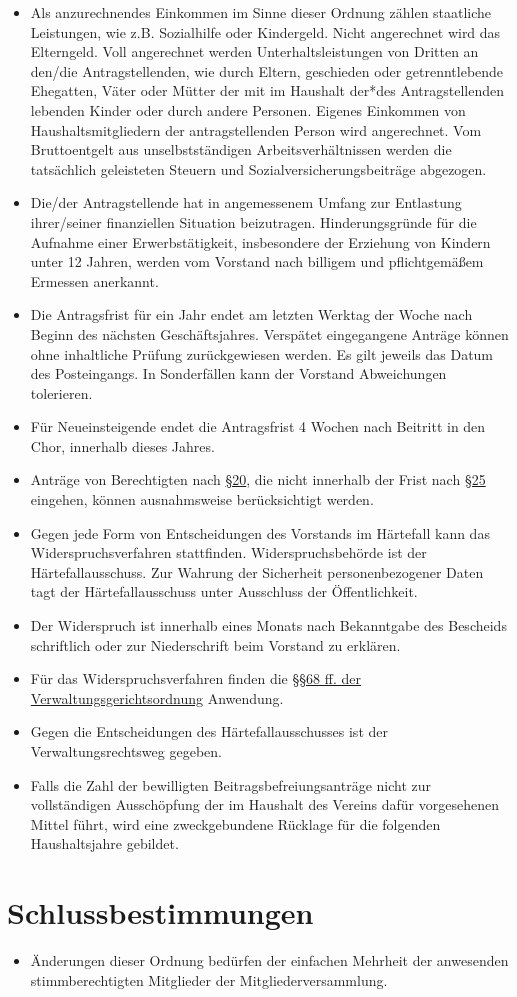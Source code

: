 \documentclass[12pt,paper=a4,ngerman]{report}
\begin{document}
\begin{itemize}
    \item Als anzurechnendes Einkommen im Sinne dieser Ordnung zählen staatliche Leistungen, wie z.B. Sozialhilfe oder Kindergeld. Nicht angerechnet wird das Elterngeld. Voll angerechnet werden Unterhaltsleistungen von Dritten an den/die Antragstellenden, wie durch Eltern, geschieden oder getrenntlebende Ehegatten, Väter oder Mütter der mit im Haushalt der*des Antragstellenden lebenden Kinder oder durch andere Personen. Eigenes Einkommen von Haushaltsmitgliedern der antragstellenden Person wird angerechnet. Vom Bruttoentgelt aus unselbstständigen Arbeitsverhältnissen werden die tatsächlich geleisteten Steuern und Sozialversicherungsbeiträge abgezogen.
    \item Die/der Antragstellende hat in angemessenem Umfang zur Entlastung ihrer/seiner finanziellen Situation beizutragen. Hinderungsgründe für die Aufnahme einer Erwerbstätigkeit, insbesondere der Erziehung von Kindern unter 12 Jahren, werden vom Vorstand nach billigem und pflichtgemäßem Ermessen anerkannt.
    \item Die Antragsfrist für ein Jahr endet am letzten Werktag der Woche nach Beginn des nächsten Geschäftsjahres. Verspätet eingegangene Anträge können ohne inhaltliche Prüfung zurückgewiesen werden. Es gilt jeweils das Datum des Posteingangs. In Sonderfällen kann der Vorstand Abweichungen tolerieren.
    \item Für Neueinsteigende endet die Antragsfrist 4 Wochen nach Beitritt in den Chor, innerhalb dieses Jahres.
    \item Anträge von Berechtigten nach \hyperref[par-20]{§20}, die nicht innerhalb der Frist nach \hyperref[par-25]{§25} eingehen, können ausnahmsweise berücksichtigt werden.
    \item Gegen jede Form von Entscheidungen des Vorstands im Härtefall kann das Widerspruchsverfahren stattfinden. Widerspruchsbehörde ist der Härtefallausschuss. Zur Wahrung der Sicherheit personenbezogener Daten tagt der Härtefallausschuss unter Ausschluss der Öffentlichkeit.
    \item Der Widerspruch ist innerhalb eines Monats nach Bekanntgabe des Bescheids schriftlich oder zur Niederschrift beim Vorstand zu erklären.
    \item Für das Widerspruchsverfahren finden die \href{https://www.gesetze-im-internet.de/vwgo/BJNR000170960.html\#BJNR000170960BJNG001001308}{§§68 ff. der Verwaltungsgerichtsordnung} Anwendung.
    \item Gegen die Entscheidungen des Härtefallausschusses ist der Verwaltungsrechtsweg gegeben.
    \item Falls die Zahl der bewilligten Beitragsbefreiungsanträge nicht zur vollständigen Ausschöpfung der im Haushalt des Vereins dafür vorgesehenen Mittel führt, wird eine zweckgebundene Rücklage für die folgenden Haushaltsjahre gebildet.
\end{itemize}

\section{Schlussbestimmungen}

\begin{itemize}
    \item Änderungen dieser Ordnung bedürfen der einfachen Mehrheit der anwesenden stimmberechtigten Mitglieder der Mitgliederversammlung.
\end{itemize}
\end{document}
